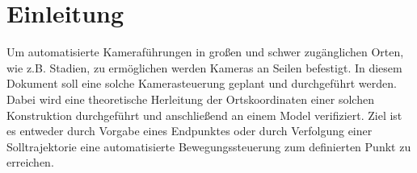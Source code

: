 \section{Einleitung}
		Um automatisierte Kameraführungen in großen und schwer zugänglichen Orten, wie z.B. Stadien, zu ermöglichen werden Kameras an Seilen befestigt.
		In diesem Dokument soll eine solche Kamerasteuerung geplant und durchgeführt werden.
		Dabei wird eine theoretische Herleitung der Ortskoordinaten einer solchen Konstruktion durchgeführt und anschließend an einem Model verifiziert.
		Ziel ist es entweder durch Vorgabe eines Endpunktes oder durch Verfolgung einer Solltrajektorie eine automatisierte Bewegungssteuerung zum definierten Punkt zu erreichen.
	\pagebreak